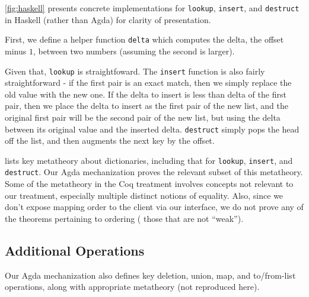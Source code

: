 \autoref{fig:haskell} presents concrete implementations for \texttt{lookup}, \texttt{insert}, and \texttt{destruct} in Haskell (rather than Agda) for clarity of presentation.
%

First, we define a helper function \verb+delta+ which computes the delta, \ie{} the offset minus $1$, between two numbers (assuming the second is larger).

Given that, \verb+lookup+ is straightfoward. The \verb+insert+ function is also fairly straightforward - if the first pair is an exact match, then we simply
%
replace the old value with the new one. If the delta to insert is less than delta of the first pair, then we place the delta to insert as the first pair of the new list, and
%
the original first pair will be the second pair of the new list, but using the delta between its original value and the inserted delta.
%
\verb+destruct+ simply pops the head off the list, and then augments the next key by the offset.

\cite[Facts about weak maps]{FMapFacts} lists key metatheory about dictionaries, including that for \verb+lookup+, \verb+insert+, and \verb+destruct+.
%
Our Agda mechanization proves the relevant subset of this metatheory. Some of the metatheory in the Coq treatment involves concepts not relevant to our treatment,
%
especially multiple distinct notions of equality. Also, since we don't expose mapping order to the client via our interface,
%
we do not prove any of the theorems pertaining to ordering (\ie{} those that are not ``weak'').


\subsection{Additional Operations}

Our Agda mechanization also defines key deletion, union, map, and to/from-list operations, along
with appropriate metatheory (not reproduced here).



